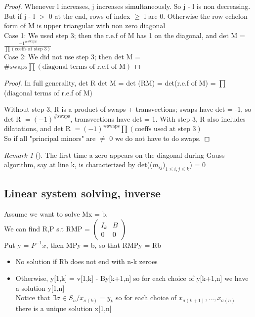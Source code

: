 \documentclass{article}
\theoremstyle{definition}
\theoremstyle{remark}
\newtheorem*{remark}{Remark}
\newcommand{\Rem}[3]{\begin{remark}[#1]\label{#2}#3\end{remark}}
\begin{document}
	\begin{proof}
		Whenever l increases, j increases simultaneously. So j - l is non decreasing. But if j - l $>$ 0 at the end, rows of index $\geq$ l are 0.
		Otherwise the row echelon form of M is upper triangular with non zero diagonal\\
		
		Case 1: We used step 3; then the r.e.f of M has 1 on the diagonal, and det M = $\frac{-1^{\text{\#swaps}}}{\prod(\text{coeffs at step 3})}$\\
		
		Case 2: We did not use step 3; then det M = $\#\text{swaps}\prod(\text{diagonal terms of r.e.f of M})$
	\end{proof}
	
	\begin{proof}
		In full generality, det R det M  = det (RM) = det(r.e.f of M) = $\prod$(diagonal terms of r.e.f of M)
		
		Without step 3, R is a product of swaps + transvections; swaps have det = -1, so det R $= (-1)^{\#\text{swaps}}$, transvections have det = 1.
		With step 3, R also includes dilatations, and det R  $= (-1)^{\#\text{swaps}} \prod(\text{coeffs used at step 3})$\\
		So if all "principal minors" are $\neq$ 0 we do not have to do swaps.
	\end{proof}
	
	\Rem{}{}{The first time a zero appears on the diagonal during Gauss algorithm, say at line k, is characterized by det(($m_{ij})_{1\leq i,j \leq k}$) = 0}
	
	\subsection{Linear system solving, inverse}
	Assume we want to solve Mx = b.\\
	We can find R,P s.t RMP = $\begin{pmatrix}
	I_k&B\\0&0
	\end{pmatrix}$\\
	Put y = $P^{-1}x$, then MPy = b, so that RMPy = Rb\\
	\begin{itemize}
		\item No solution if Rb does not end with n-k zeroes
		\item Otherwise, y[1,k] = v[1,k] - By[k+1,n] so for each choice of y[k+1,n] we have a solution y[1,n]\\
		
		Notice that $\exists \sigma \in S_n / x_{\sigma(k)} = y_k$ so for each choice of $x_{\sigma(k+1)},\dots,x_{\sigma(n)}$ there is a unique solution x[1,n] 
	\end{itemize}
	
\end{document}
